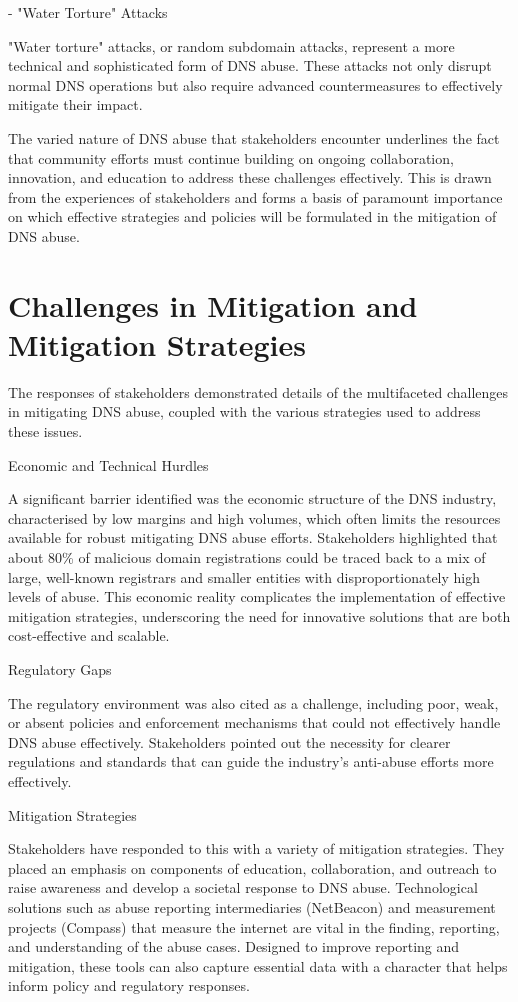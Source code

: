 - "Water Torture" Attacks

"Water torture" attacks, or random subdomain attacks, represent a more technical and sophisticated form of DNS abuse. These attacks not only disrupt normal DNS operations but also require advanced countermeasures to effectively mitigate their impact.

The varied nature of DNS abuse that stakeholders encounter underlines the fact that community efforts must continue building on ongoing collaboration, innovation, and education to address these challenges effectively. This is drawn from the experiences of stakeholders and forms a basis of paramount importance on which effective strategies and policies will be formulated in the mitigation of DNS abuse.

\section{Challenges in Mitigation and Mitigation Strategies} 

The responses of stakeholders demonstrated details of the multifaceted challenges in mitigating DNS abuse, coupled with the various strategies used to address these issues.

Economic and Technical Hurdles

A significant barrier identified was the economic structure of the DNS industry, characterised by low margins and high volumes, which often limits the resources available for robust mitigating DNS abuse efforts. Stakeholders highlighted that about 80\% of malicious domain registrations could be traced back to a mix of large, well-known registrars and smaller entities with disproportionately high levels of abuse. This economic reality complicates the implementation of effective mitigation strategies, underscoring the need for innovative solutions that are both cost-effective and scalable.

Regulatory Gaps

The regulatory environment was also cited as a challenge, including poor, weak, or absent policies and enforcement mechanisms that could not effectively handle DNS abuse effectively. Stakeholders pointed out the necessity for clearer regulations and standards that can guide the industry's anti-abuse efforts more effectively.

Mitigation Strategies

Stakeholders have responded to this with a variety of mitigation strategies. They placed an emphasis on components of education, collaboration, and outreach to raise awareness and develop a societal response to DNS abuse. Technological solutions such as abuse reporting intermediaries (NetBeacon) and measurement projects (Compass) that measure the internet are vital in the finding, reporting, and understanding of the abuse cases. Designed to improve reporting and mitigation, these tools can also capture essential data with a character that helps inform policy and regulatory responses.

